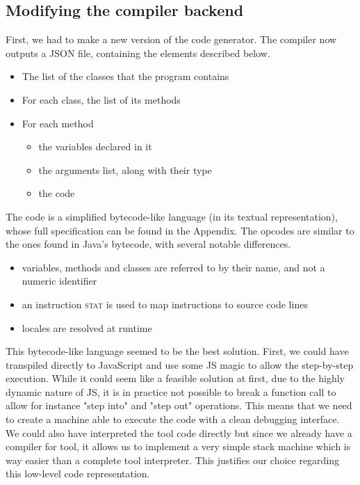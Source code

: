 \subsection{Modifying the compiler backend}
\label{backend}

First, we had to make a new version of the code generator. The compiler now outputs a JSON file, containing the elements described below.

\begin{itemize}
\item The list of the classes that the program contains
\item For each class, the list of its methods
\item For each method
	\begin{itemize}
	\item the variables declared in it
	\item the arguments list, along with their type
	\item the code
	\end{itemize}
\end{itemize}

The code is a simplified bytecode-like language (in its textual representation), whose full specification can be found in the Appendix. The opcodes are similar to the ones found in Java's bytecode, with several notable differences.

\begin{itemize}
\item variables, methods and classes are referred to by their name, and not a numeric identifier
\item an instruction \textsc{stat} is used to map instructions to source code lines
\item locales are resolved at runtime
\end{itemize}

This bytecode-like language seemed to be the best solution. First, we could have transpiled directly to JavaScript and use some JS magic to allow the step-by-step execution. While it could seem like a feasible solution at first, due to the highly dynamic nature of JS, it is in practice not possible to break a function call to allow for instance "step into" and "step out" operations. This means that we need to create a machine able to execute the code with a clean debugging interface. We could also have interpreted the tool code directly but since we already have a compiler for tool, it allows us to implement a very simple stack machine which is way easier than a complete tool interpreter. This justifies our choice regarding this low-level code representation.

